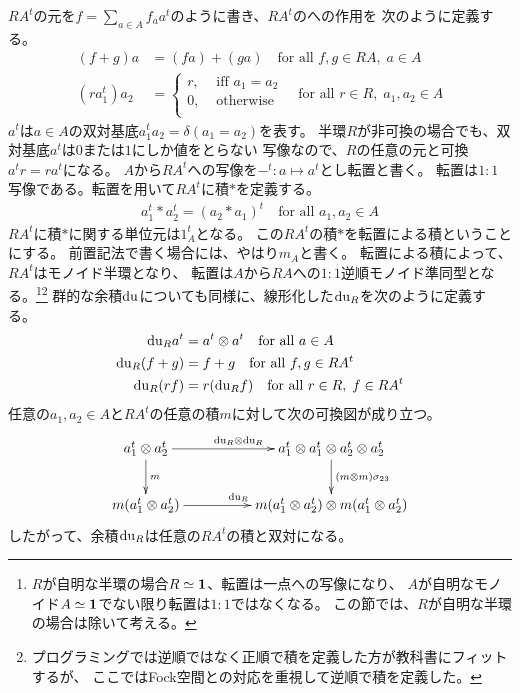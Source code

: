 	$RA^t$の元を$f=\sum_{a\in A}f_aa^t$のように書き、$RA^t$のへの作用を
	次のように定義する。
	\begin{equation}\begin{split} %
		(f+g)a &= (fa) + (ga) \quad\text{for all }f,g\in RA,\;a\in A \\
		(ra_1^t)a_2 &= \begin{cases} %
			r, &\text{ iff } a_1=a_2 \\
			0, &\text{ otherwise } \\
		\end{cases} \quad\text{for all }r\in R,\;a_1,a_2\in A %
	\end{split}\end{equation} %
	$a^t$は$a\in A$の双対基底$a_1^ta_2=\delta(a_1=a_2)$を表す。
	半環$R$が非可換の場合でも、双対基底$a^t$は$0$または$1$にしか値をとらない
	写像なので、$R$の任意の元と可換$a^tr=ra^t$になる。
	$A$から$RA^t$への写像を$-^t:a\mapsto a^t$とし転置と書く。
	転置は$1:1$写像である。転置を用いて$RA^t$に積$*$を定義する。
	\begin{equation}\begin{split} %
		a_1^t*a_2^t = (a_2*a_1)^t \quad\text{for all }a_1,a_2\in A
	\end{split}\end{equation} %
	$RA^t$に積$*$に関する単位元は$1_A^t$となる。
	この$RA^t$の積$*$を転置による積ということにする。
	前置記法で書く場合には、やはり$m_A$と書く。
	転置による積によって、$RA^t$はモノイド半環となり、
	転置は$A$から$RA$への$1:1$逆順モノイド準同型となる。\footnote{
		$R$が自明な半環の場合$R\simeq{\mathbf{1}}$、転置は一点への写像になり、
		$A$が自明なモノイド$A\simeq{\mathbf{1}}$でない限り転置は$1:1$ではなくなる。
		この節では、$R$が自明な半環の場合は除いて考える。
	}\footnote{
		プログラミングでは逆順ではなく正順で積を定義した方が教科書にフィットするが、
		ここではFock空間との対応を重視して逆順で積を定義した。
	}
	群的な余積${\operatorname{du}}$についても同様に、線形化した${\operatorname{du}}_R$を次のように定義する。
	\begin{equation}\begin{split} %
		\mydu_Ra^t &= a^t\otimes a^t \quad\text{for all }a\in A \\
		\mydu_R(f+g) &= f+g \quad\text{for all }f,g\in RA^t \\
		\mydu_R(rf) &= r(\mydu_R f) \quad\text{for all }r\in R,\;f\in RA^t \\
	\end{split}\end{equation} %
	任意の$a_1,a_2\in A$と$RA^t$の任意の積$m$に対して次の可換図が成り立つ。
	\begin{equation}\xymatrix@C+2pc{
		a_1^t\otimes a_2^t \ar[r]^{\mydu_R\otimes \mydu_R} \ar[d]^{m}
		& a_1^t\otimes a_1^t\otimes a_2^t\otimes a_2^t \ar[d]^{(m\otimes m)\sigma_{23}} \\
		m(a_1^t\otimes a_2^t) \ar[r]^{\mydu_R} & m(a_1^t\otimes a_2^t)\otimes m(a_1^t\otimes a_2^t) \\
	}\end{equation}
	したがって、余積${\operatorname{du}}_R$は任意の$RA^t$の積と双対になる。


